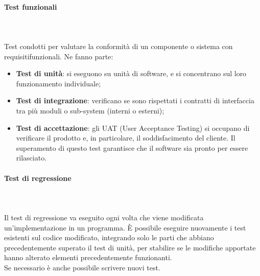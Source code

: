 \paragraph*{Test funzionali} \mbox{} \\ \mbox{} \\
Test condotti per valutare la conformità di un componente o sistema con requisiti\glo funzionali. Ne fanno parte: \begin{itemize}
\item \textbf{Test di unità}: si eseguono su unità di software, e si concentrano sul loro funzionamento individuale;
\item \textbf{Test di integrazione}: verificano se sono rispettati i contratti di interfaccia tra più moduli o sub-system (interni o esterni);
\item \textbf{Test di accettazione}: gli UAT (User Acceptance Testing) si occupano di verificare il prodotto e, in particolare, il soddisfacimento del cliente. Il superamento di questo test garantisce che il software sia pronto per essere rilasciato.
\end{itemize}

\paragraph*{Test di regressione} \mbox{} \\ \mbox{} \\
Il test di regressione va eseguito ogni volta che viene modificata un'implementazione in un programma. È possibile eseguire nuovamente i test esistenti sul codice modificato, integrando solo le parti che abbiano precedentemente superato il test di unità, per stabilire se le modifiche apportate hanno alterato elementi precedentemente funzionanti.\\ Se necessario è anche possibile scrivere nuovi test.

